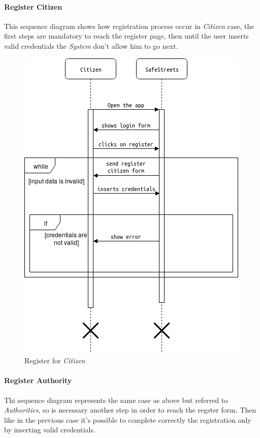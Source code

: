 \documentclass{article}
\begin{document}
\paragraph{Register Citizen}
This sequence diagram shows how registration process occur in \textit{Citizen} case, the first steps are mandatory to reach
the register page, then until the user inserts valid credentials the \textit{System} don't allow him to go next.  
\begin{figure}[H]
    \centering
    \includegraphics[scale=0.5]{img/sequence_diagrams/register_citizen.png}
    \caption{Register for \textit{Citizen}}
\end{figure}

\paragraph{Register Authority}
Thi sequence diagram represents the same case as above but referred to \textit{Authorities}, so is necessary another
step in order to reach the regster form. Then like in the previous case it's possible to complete correctly the registration
only by inserting valid credentials.
\end{document}
